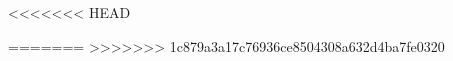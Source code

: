 \documentclass[a4paper, 11pt, oneside]{AuProjectHandin}
\begin{document}

\frontmatter
\tableofcontents
\mainmatter
%	





<<<<<<< HEAD



=======
%
>>>>>>> 1c879a3a17c76936ce8504308a632d4ba7fe0320
\backmatter

\end{document}
